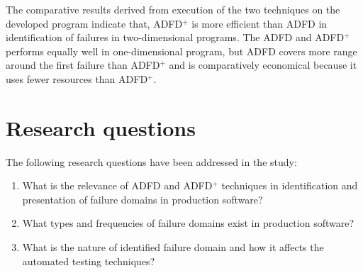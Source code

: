 The comparative results derived from execution of the two techniques on the developed program indicate that, ADFD$^+$ is more efficient than ADFD in identification of failures in two-dimensional programs. The ADFD and ADFD$^+$ performs equally well in one-dimensional program, but ADFD covers more range around the first failure than ADFD$^+$ and is comparatively economical because it uses fewer resources than ADFD$^+$.


\section{Research questions} \label{sec:questions}
The following research questions have been addressed in the study:
\begin{enumerate}
%
\item What is the relevance of ADFD and ADFD$^+$ techniques in identification and presentation of failure domains in production software? %

%
%
\item What types and frequencies of failure domains exist in production software? %
%
\item What is the nature of identified failure domain and how it affects the automated testing techniques? %


\end{enumerate}
